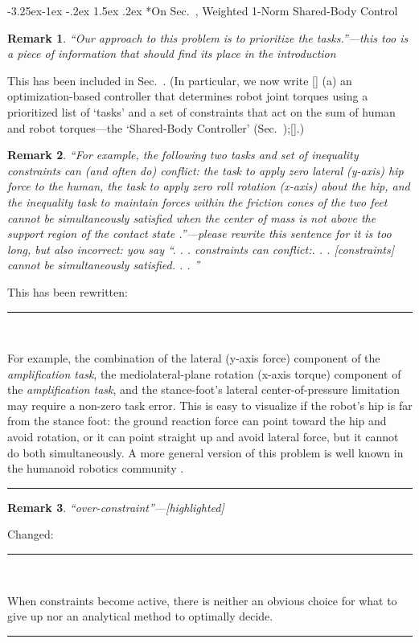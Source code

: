 \documentclass[10pt,letterpaper]{letter}
\makeatletter
\renewcommand*{\ref}[1]{\zref{#1}}
\newcommand*{\ta}[1]{\textcolor[HTML]{107f10}{#1}}
\newcommand*{\ra}[1]{}
\newcounter{reviewer}
\newtheorem{rev}{Remark}[reviewer]
\newcounter{section}
\newcounter{subsection}[section]
\newcounter{subsubsection}[subsection]
\newcommand\subsubsection{\@startsection{subsubsection}{2}{\z@}%
	{-3.25ex\@plus -1ex \@minus -.2ex}%
	{1.5ex \@plus .2ex}%
	{\normalfont\large\bfseries}}
\newcommand{\reviewer}[1]{\begin{rev} #1\end{rev}}
\newcommand{\response}[1]{\par{\hfill\begin{minipage}{\dimexpr\textwidth-2cm} #1\end{minipage}}}
\newcommand{\paperquote}[1]{%
	\begin{center}
		
		\begin{minipage}{.8\textwidth}
			{\rule{\textwidth}{.5pt}}\vspace{.5em}\\
			\begin{minipage}{\textwidth}\setlength{\parindent}{2em}#1\end{minipage}
			\vspace{.5em}
			{\rule{\textwidth}{.5pt}}
		\end{minipage}%
	\end{center}
}
\makeatother
\begin{document}
\begin{letter}{}
\subsubsection*{On Sec.~\ref{sec:opt}, Weighted 1-Norm Shared-Body Control}

\reviewer{``Our approach to this problem is to prioritize the tasks.''---this too is a piece of information that should find its place in the introduction}
\response{This has been included in Sec.~\ref{update:intro}. (In particular, we now write \ta{[\textellipsis] (a) an optimization-based controller that determines robot joint torques using a prioritized list of `tasks' and a set of constraints that act on the sum of human and robot torques---the `Shared-Body Controller' (Sec.~\ref{sec:opt});[\textellipsis]}.)}

\reviewer{``For example, the following two tasks and set of inequality constraints can (and often do) conflict: the task to apply zero lateral (y-axis) hip force to the human, the task to apply zero roll rotation (x-axis) about the hip, and the inequality task to maintain forces within the friction cones of the two feet cannot be simultaneously satisfied when the center of mass is not above the support region of the contact state \cite{BretlLall2008TRO}.''---please rewrite this sentence for it is too long, but also incorrect: you say ``. . . constraints can conflict:. . .  [constraints] cannot be simultaneously satisfied. . . ''}
\response{This has been rewritten:}
\paperquote{
\ta{For example, the combination of the lateral (y-axis force) component of the \emph{amplification task}, the mediolateral-plane rotation (x-axis torque) component of the \emph{amplification task}, and the stance-foot's lateral center-of-pressure limitation may require a non-zero task error. This is easy to visualize if the robot's hip is far from the stance foot: the ground reaction force can point toward the hip and avoid rotation, or it can point straight up and avoid lateral force, but it cannot do both simultaneously. A more general version of this problem is well known in the humanoid robotics community \cite{BretlLall2008TRO}.}
}

\reviewer{``over-constraint''---[highlighted]}
\response{Changed:}\paperquote{
\ra{Without an analytical method to determine the relative desirability of the various solutions to the over-constraint problem, we must rely on our intuition and trial and error.}\ta{When constraints become active, there is neither an obvious choice for what to give up nor an analytical method to optimally decide.}
}


\end{letter}
\end{document}
